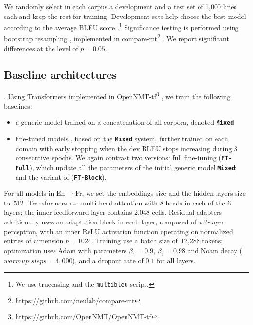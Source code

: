 \documentclass[11pt,a4paper]{article}
\newcommand{\fyTodo}[1]{\Todo[FY:]{\textcolor{orange}{#1}}}
\newcommand{\fyDone}[1]{\done[FY]\Todo[FY:]{\textcolor{orange}{#1}}}
\newcommand{\system}[1]{\texttt{\textbf{#1}}}
\begin{document}
We randomly select in each corpus a development and a test set of 1,000 lines each and keep the rest for training. Development sets help choose the best model according to the average BLEU score \cite{Papineni02bleu}.\footnote{We use truecasing and the \texttt{multibleu} script.}\fyDone{A word about meta-parameter settings} Significance testing is performed using bootstrap resampling \cite{Koehn04statistical}, implemented in compare-mt\footnote{\url{https://github.com/neulab/compare-mt}} \cite{Neubig19compare-mt}. We report significant differences at the level of $p=0.05$.\fyTodo{Is this part still accurate ?}

\subsection{Baseline architectures \label{ssec:baseline}}
\fyTodo{Write this - settings and parameters for Mix-Nat and Full-FT}.
Using Transformers \cite{Vaswani17attention} implemented in OpenNMT-tf\footnote{\url{https://github.com/OpenNMT/OpenNMT-tf}} \cite{Klein17opennmt}, we train the following baselines:
\begin{itemize}
\item a generic model trained on a concatenation of all corpora, denoted \system{Mixed}\fyTodo{Or mixed nat ?}
\item fine-tuned models \cite{Luong15stanford,Freitag16fast}, based on the \system{Mixed} system, further trained on each domain with early stopping when the dev BLEU stops increasing during 3 consecutive epochs. We again contrast two versions: full fine-tuning (\system{FT-Full}), which update all the parameters of the initial generic model \system{Mixed}; and the variant of \cite{Bapna19simple} (\system{FT-Block}).
\end{itemize}

For all models in En$\rightarrow{}$Fr, we set the embeddings size and the hidden layers size to~512. Transformers use multi-head attention with 8 heads in each of the 6 layers; the inner feedforward layer contains 2,048 cells. Residual adapters additionally uses an adaptation block in each layer, composed of a 2-layer perceptron, with an inner ReLU activation function operating on normalized entries of dimension $b=1024$.
Training use a batch size of~12,288 tokens; optimization uses Adam with parameters $\beta_1=0.9$, $\beta_2= 0.98$ and Noam decay ($warmup\_steps=4,000$), and a dropout rate of $0.1$ for all layers.\fyDone{Describe the block adaptation layer - voir slides}
\end{document}
